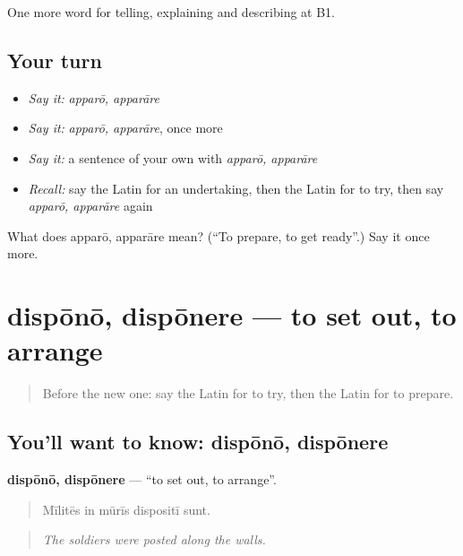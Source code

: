\begin{grammarlens}[title={What you've built}]
One more word for telling, explaining and describing at B1.
\end{grammarlens}

\subsection*{Your turn}
\begin{itemize}
\raggedright
  \item \emph{Say it:} \emph{apparō, apparāre}
  \item \emph{Say it:} \emph{apparō, apparāre}, once more
  \item \emph{Say it:} a sentence of your own with \emph{apparō, apparāre}
  \item \emph{Recall:} say the Latin for an undertaking, then the Latin for to try, then say \emph{apparō, apparāre} again
\end{itemize}

\begin{tcolorbox}[breakable,colback=teal!4,colframe=teal!35!black,title={Before you move on}]
What does apparō, apparāre mean? (\textquotedblleft{}To prepare, to get ready\textquotedblright{}.) Say it once more.
\end{tcolorbox}
\section[dispōnō, dispōnere]{dispōnō, dispōnere — to set out, to arrange}

\label{lesson:LA-C394-dispono}



\begin{quote}
Before the new one: say the Latin for to try, then the Latin for to prepare.
\end{quote}

\subsection*{You'll want to know: dispōnō, dispōnere}
\textbf{dispōnō, dispōnere} — \textquotedblleft{}to set out, to arrange\textquotedblright{}.

\begin{quote}
Mīlitēs in mūrīs dispositī sunt.
\end{quote}

\begin{quote}
\emph{The soldiers were posted along the walls.}
\end{quote}

